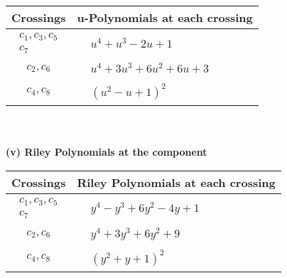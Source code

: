 \documentclass[1p]{elsarticle_modified}
\theoremstyle{definition}
\begin{document}
\begin{tabular}{m{50pt}|m{274pt}}
Crossings & \hspace{64pt}u-Polynomials at each crossing \\
\hline $$\begin{aligned}c_{1},c_{3},c_{5}\\c_{7}\end{aligned}$$&$\begin{aligned}
&u^4+u^3-2 u+1
\end{aligned}$\\
\hline $$\begin{aligned}c_{2},c_{6}\end{aligned}$$&$\begin{aligned}
&u^4+3 u^3+6 u^2+6 u+3
\end{aligned}$\\
\hline $$\begin{aligned}c_{4},c_{8}\end{aligned}$$&$\begin{aligned}
&(u^2- u+1)^2
\end{aligned}$\\
\hline
\end{tabular}\\~\\
\newpage\renewcommand{\arraystretch}{1}
\flushleft \textbf{(v) Riley Polynomials at the component}\newline \\
\begin{tabular}{m{50pt}|m{274pt}}
Crossings & \hspace{64pt}Riley Polynomials at each crossing \\
\hline $$\begin{aligned}c_{1},c_{3},c_{5}\\c_{7}\end{aligned}$$&$\begin{aligned}
&y^4- y^3+6 y^2-4 y+1
\end{aligned}$\\
\hline $$\begin{aligned}c_{2},c_{6}\end{aligned}$$&$\begin{aligned}
&y^4+3 y^3+6 y^2+9
\end{aligned}$\\
\hline $$\begin{aligned}c_{4},c_{8}\end{aligned}$$&$\begin{aligned}
&(y^2+y+1)^2
\end{aligned}$\\
\hline
\end{tabular}\\~\\
\end{document}
